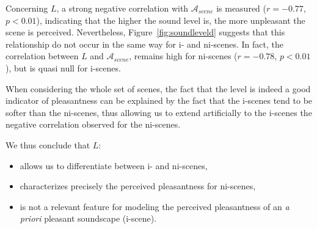 \documentclass[12pt]{elsarticle}
\begin{document}

Concerning $L$, a strong negative correlation with $\mathcal{A}_{scene}$ is measured ($r=-0.77$, $p<0.01$), indicating that the higher the sound level is, the more unpleasant the scene is perceived. Nevertheless, Figure~\ref{fig:soundleveld} suggests that this relationship do not occur in the same way for i- and ni-scenes. In fact, the correlation between $L$ and $\mathcal{A}_{scene}$, remains high for ni-scenes ($r=-0.78$, $p<0.01$), but is quasi null for i-scenes.


When considering the whole set of scenes, the fact that the level is indeed a good indicator of pleasantness can be explained by the fact that the i-scenes tend to be softer than the ni-scenes, thus allowing us to extend artificially to the i-scenes the negative correlation observed for the ni-scenes.

%

We thus conclude that $L$:

\begin{itemize}
\item allows us to differentiate between i- and ni-scenes,
\item characterizes precisely the perceived pleasantness for ni-scenes,
\item is not a relevant feature for modeling the perceived pleasantness of an \textit{a priori} pleasant soundscape (i-scene).
\end{itemize}
\end{document}
